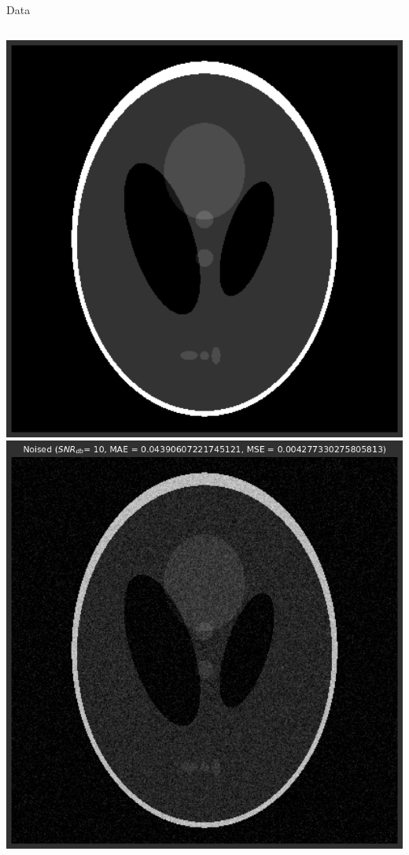 \begin{frame}{Data}
\centering
\begin{columns}
\centering
\includegraphics[scale=0.25]{images/results/original.png}
\centering
\includegraphics[scale=0.25]{images/results/noised.png}
\end{columns}
\end{frame}

